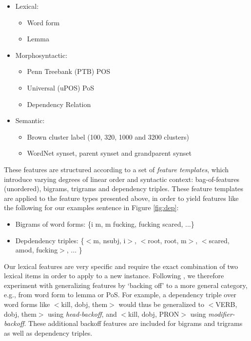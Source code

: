 \documentclass[11pt,letterpaper]{article}
\begin{document}
\begin{itemize}[noitemsep]
\item Lexical:
  \begin{itemize}[noitemsep]
  \item Word form
  \item Lemma
  \end{itemize}
  
\item Morphosyntactic:
  \begin{itemize}[noitemsep]
  \item Penn Treebank (PTB) POS
  \item Universal (uPOS) PoS
  \item Dependency Relation
  \end{itemize}
  
\item Semantic:
  \begin{itemize}[noitemsep]
    \item Brown cluster label (100, 320, 1000 and 3200 clusters)
    \item WordNet synset, parent synset and grandparent synset
  \end{itemize}
\end{itemize}


These features are structured according to a set of \emph{feature templates}, which introduce varying degrees of linear order and syntactic context: bag-of-features (unordered), bigrams, trigrams and dependency triples. These feature templates are applied to the feature types presented above, in order to yield features like the following for our examples sentence in Figure \ref{fig:dep}:

\begin{itemize}
\setlength\itemsep{0em}
\item Bigrams of word forms: \{i m,  m fucking, fucking scared, ...\}

\item Depdendency triples: \{$<$m, nsubj, i$>$, $<$root, root, m$>$, $<$scared, amod, fucking$>$, ... \}
\end{itemize}
Our lexical features are very specific and require the exact combination of two lexical items in order to apply to a new instance. Following , we therefore experiment with generalizing features by `backing off' to a more general category, e.g., from word form to lemma or PoS. For example, a dependency triple over word forms like $<$kill, dobj, them$>$ would thus be generalized to $<$VERB, dobj, them$>$ using \emph{head-backoff}, and $<$kill, dobj, PRON$>$ using \emph{modifier-backoff}. These additional backoff features are included for bigrams and trigrams as well as dependency triples.
\end{document}
